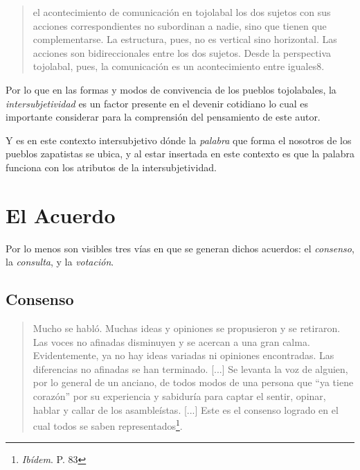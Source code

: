 \documentclass[oneside]{book}
\begin{document}
\begin{quote}
el acontecimiento de comunicación en tojolabal los dos sujetos con sus acciones correspondientes no subordinan a nadie, sino que tienen que complementarse. La estructura, pues, no es vertical sino horizontal. Las acciones son bidireccionales entre los dos sujetos. Desde la perspectiva tojolabal, pues, la comunicación es un acontecimiento entre iguales8.
\end{quote}

Por lo que en las formas y modos de convivencia de los pueblos tojolabales, la \textit{intersubjetividad} es un factor presente en el devenir cotidiano lo cual es importante considerar para la comprensión del pensamiento de este autor.

Y es en este contexto intersubjetivo dónde la \textit{palabra} que forma el nosotros de los pueblos zapatistas se ubica, y al estar insertada en este contexto es que la palabra funciona con los atributos de la intersubjetividad. 

\section{El Acuerdo}

Por lo menos son visibles tres vías en que se generan dichos acuerdos: el \textit{consenso}, la \textit{consulta}, y la \textit{votación}.

\subsection{Consenso}
\begin{quote}
Mucho se habló. Muchas ideas y opiniones se propusieron y se retiraron. Las voces no afinadas disminuyen y se acercan a una gran calma. Evidentemente, ya no hay ideas variadas ni opiniones encontradas. Las diferencias no afinadas se han terminado. [...] Se levanta la voz de alguien, por lo general de un anciano, de todos modos de una persona que “ya tiene corazón” por su experiencia y sabiduría para captar el sentir, opinar, hablar y callar de los asambleístas. [...] Este es el consenso logrado en el cual todos se saben representados\footnote{\textit{Ibídem}. P. 83}.
\end{quote}	
\end{document}
